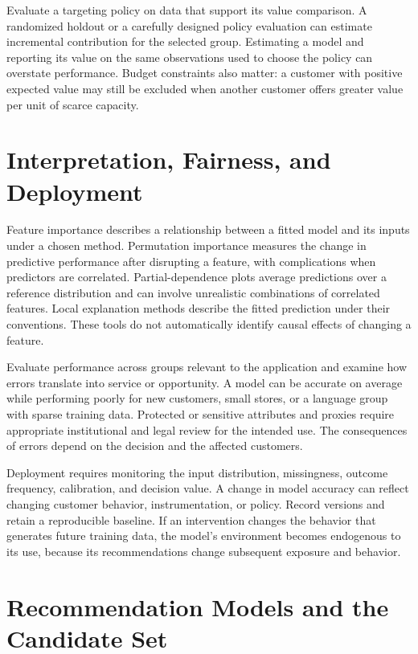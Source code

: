 Evaluate a targeting policy on data that support its value comparison. A
randomized holdout or a carefully designed policy evaluation can
estimate incremental contribution for the selected group. Estimating a
model and reporting its value on the same observations used to choose
the policy can overstate performance. Budget constraints also matter: a
customer with positive expected value may still be excluded when another
customer offers greater value per unit of scarce capacity.

\hypertarget{M07-interpretation-fairness-and-deployment}{%
\section{Interpretation, Fairness, and
Deployment}\label{M07-interpretation-fairness-and-deployment}}

\noindent Feature importance describes a relationship between a fitted model and
its inputs under a chosen method. Permutation importance measures the
change in predictive performance after disrupting a feature, with
complications when predictors are correlated. Partial-dependence plots
average predictions over a reference distribution and can involve
unrealistic combinations of correlated features. Local explanation
methods describe the fitted prediction under their conventions. These
tools do not automatically identify causal effects of changing a
feature.

Evaluate performance across groups relevant to the application and
examine how errors translate into service or opportunity. A model can be
accurate on average while performing poorly for new customers, small
stores, or a language group with sparse training data. Protected or
sensitive attributes and proxies require appropriate institutional and
legal review for the intended use. The consequences of errors depend on
the decision and the affected customers.

Deployment requires monitoring the input distribution, missingness,
outcome frequency, calibration, and decision value. A change in model
accuracy can reflect changing customer behavior, instrumentation, or
policy. Record versions and retain a reproducible baseline. If an
intervention changes the behavior that generates future training data,
the model's environment becomes endogenous to its use, because its
recommendations change subsequent exposure and behavior.

\hypertarget{M07-recommendation-models-and-the-candidate-set}{%
\section{Recommendation Models and the Candidate
Set}\label{M07-recommendation-models-and-the-candidate-set}}

